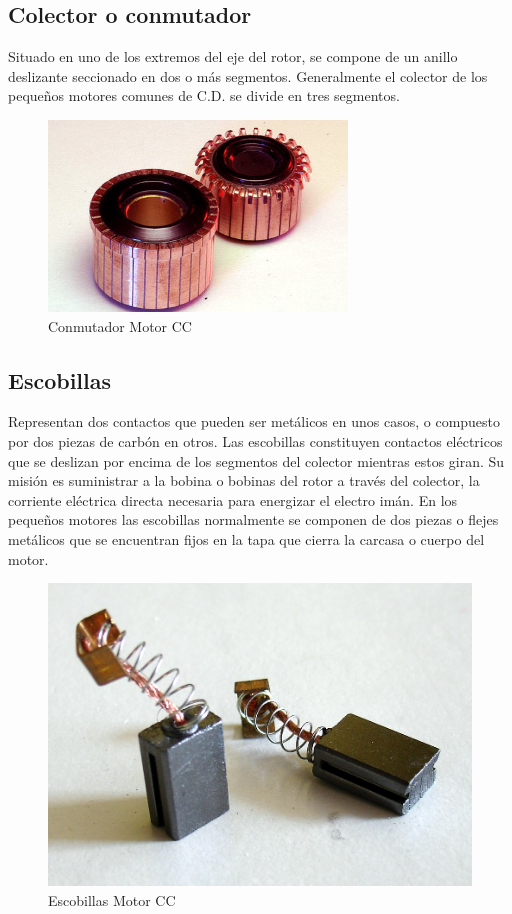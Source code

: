 \documentclass[12pt,a4paper]{article}
\begin{document}
\subsection*{Colector o conmutador}
Situado en uno de los extremos del eje del rotor, se compone de un anillo deslizante seccionado en dos o más segmentos. Generalmente el colector de los pequeños motores comunes de C.D. se divide en tres segmentos.
\begin{figure}[hbtp]
\centering
\includegraphics[scale=0.5]{Circuitos/conmutadores.png}
\caption{Conmutador Motor CC}
\end{figure}

\subsection*{Escobillas}
Representan dos contactos que pueden ser metálicos en unos casos, o compuesto por dos piezas de carbón en otros. Las escobillas constituyen contactos eléctricos que se deslizan por encima de los segmentos del colector mientras estos giran. Su misión es suministrar a la bobina o bobinas del rotor a través del colector, la corriente eléctrica directa necesaria para energizar el electro imán. En los pequeños motores las escobillas normalmente se componen de dos piezas o flejes metálicos que se encuentran fijos en la tapa que cierra la carcasa o cuerpo del motor.
\begin{figure}[hbtp]
\centering
\includegraphics[scale=0.2]{Circuitos/escobillas.jpg}
\caption{Escobillas Motor CC}
\end{figure}
\end{document}
